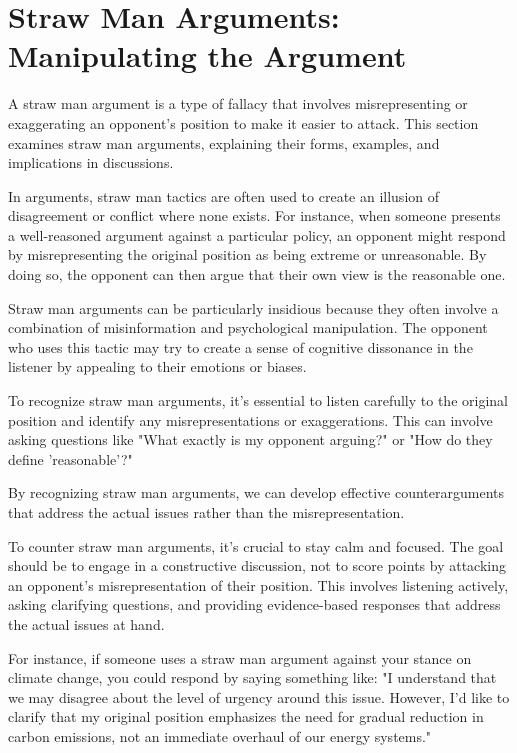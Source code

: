 \documentclass{report}%
\begin{document}
{{{{{{{{{{{{{{%
\section{Straw Man Arguments: Manipulating the Argument}

A straw man argument is a type of fallacy that involves misrepresenting or exaggerating an opponent's position to make it easier to attack. This section examines straw man arguments, explaining their forms, examples, and implications in discussions.

In arguments, straw man tactics are often used to create an illusion of disagreement or conflict where none exists. For instance, when someone presents a well-reasoned argument against a particular policy, an opponent might respond by misrepresenting the original position as being extreme or unreasonable. By doing so, the opponent can then argue that their own view is the reasonable one.

Straw man arguments can be particularly insidious because they often involve a combination of misinformation and psychological manipulation. The opponent who uses this tactic may try to create a sense of cognitive dissonance in the listener by appealing to their emotions or biases.

To recognize straw man arguments, it's essential to listen carefully to the original position and identify any misrepresentations or exaggerations. This can involve asking questions like "What exactly is my opponent arguing?" or "How do they define 'reasonable'?"

By recognizing straw man arguments, we can develop effective counterarguments that address the actual issues rather than the misrepresentation.

To counter straw man arguments, it's crucial to stay calm and focused. The goal should be to engage in a constructive discussion, not to score points by attacking an opponent's misrepresentation of their position. This involves listening actively, asking clarifying questions, and providing evidence-based responses that address the actual issues at hand.

For instance, if someone uses a straw man argument against your stance on climate change, you could respond by saying something like: "I understand that we may disagree about the level of urgency around this issue. However, I'd like to clarify that my original position emphasizes the need for gradual reduction in carbon emissions, not an immediate overhaul of our energy systems."

}}}}}}}}}}}}}}
\end{document}
